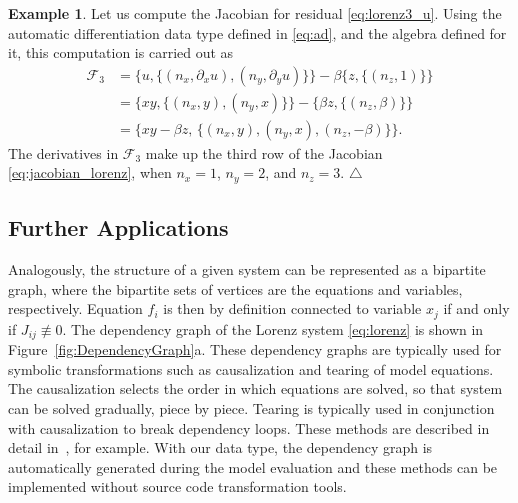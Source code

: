 \documentclass[10pt]{ijnam}
\theoremstyle{definition}
\newtheorem{example}{Example}[section]
\newcommand\xqed[1]{\leavevmode\unskip\penalty9999 \hbox{}\nobreak\hfill \quad\hbox{#1}}
\newcommand{\exampleSymbol}{\xqed{$\triangle$}}
\begin{document}
\begin{example}
Let us compute the Jacobian for residual \eqref{eq:lorenz3_u}.
Using the automatic differentiation data type defined in \eqref{eq:ad}, and the 
algebra defined for it, this computation is carried out as
\begin{equation*}
    \begin{split}
        \mathcal{F}_3 &= \{ u, \{ (n_x,\partial_x u), (n_y, \partial_y u) \} \} 
                       - \beta \{ z, \{(n_z, 1) \} \}                            \\
                      &= \{ xy, \{(n_x, y), (n_y, x)\} \} 
                       - \{ \beta z, \{ (n_z, \beta) \} \}                       \\
                      &= \{ xy - \beta z, \, \{(n_x, y), (n_y, x), (n_z, -\beta) \} \}.
    \end{split}
\end{equation*}
The derivatives in $\mathcal{F}_3$ make up the third row of the Jacobian
\eqref{eq:jacobian_lorenz}, when $n_x = 1$, $n_y = 2$, and $n_z = 3$. \exampleSymbol
\end{example}

\subsection{Further Applications}
\label{subsec:Further Applications}

Analogously, the structure of a given system can be represented as a bipartite graph, where the bipartite sets of vertices are the equations and variables, respectively. Equation $ f_i $ is then by definition connected to variable $ x_j $ if and only if $ J_{ij} \not \equiv 0 $. The dependency graph of the Lorenz system \eqref{eq:lorenz} is shown in Figure~\ref{fig:DependencyGraph}a. These dependency graphs are typically used for symbolic transformations such as causalization and tearing of model equations. The causalization selects the order in which equations are solved, so that system can be solved gradually, piece by piece. Tearing is typically used in conjunction with causalization to break dependency loops. These methods are described in detail in~\cite{cellier2006}, for example. With our data type, the dependency graph is automatically generated during the model evaluation and these methods can be implemented without source code transformation tools.
\end{document}
